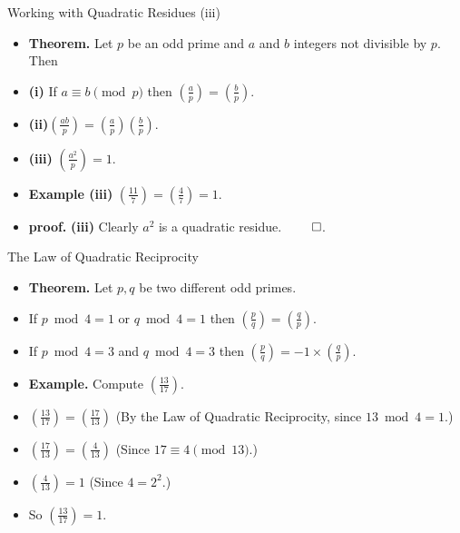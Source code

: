 \documentclass{beamer}
\begin{document}
\begin{frame}{Working with Quadratic Residues (iii)}

\begin{itemize}
  \item \textbf{Theorem.} Let $p$ be an odd prime and $a$ and $b$ integers not divisible by $p$. Then
  \item \textbf{(i)} If $a\equiv b \pmod p$ then $(\frac{a}{p})=(\frac{b}{p})$.
  \item \textbf{(ii)}$(\frac{ab}{p})=(\frac{a}{p})(\frac{b}{p})$.
  \item \textbf{(iii)} $(\frac{a^2}{p})=1$.
  \item \textbf{Example (iii)} $(\frac{11}{7}) = (\frac{4}{7})=1$.
  \item \textbf{proof.} \textbf{(iii)} Clearly $a^2$ is a quadratic residue. $\qed$.
\end{itemize}
\end{frame}


\begin{frame}{The Law of Quadratic Reciprocity}

\begin{itemize}
  \item \textbf{Theorem.} Let $p,q$ be two different odd primes.
  \item If $p\bmod 4 = 1$ or $q\bmod 4 = 1$ then $(\frac{p}{q}) = (\frac{q}{p})$.
  \item If $p\bmod 4 = 3$ and $q\bmod 4 = 3$ then $(\frac{p}{q}) = -1 \times (\frac{q}{p})$.
  \item \textbf{Example.} Compute $(\frac{13}{17})$.
  \item $(\frac{13}{17}) = (\frac{17}{13})$ (By the Law of Quadratic Reciprocity, since $13\bmod4=1$.)
  \item $(\frac{17}{13}) = (\frac{4}{13})$ (Since $17\equiv 4 \pmod {13}$.)
  \item $(\frac{4}{13}) = 1$ (Since $4=2^2$.)
  \item So $(\frac{13}{17}) = 1$.
\end{itemize}
\end{frame}

\end{document}
